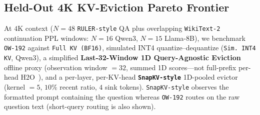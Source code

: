 \documentclass[11pt]{article}
\renewcommand{\_}{\origunderscore\allowbreak}
\begin{document}
\subsection{Held-Out 4K KV-Eviction Pareto Frontier}
\label{sec:kv4k}
At $4\text{K}$ context ($N=48$ \texttt{RULER-style} QA plus overlapping \texttt{WikiText-2} continuation PPL windows: $N=16$ Qwen3, $N=15$ Llama-8B), we benchmark \texttt{OW-192} against \texttt{Full KV (BF16)}, simulated INT4 quantize--dequantize (\texttt{Sim.\ INT4 KV}, Qwen3), a simplified \textbf{Last-32-Window 1D Query-Agnostic Eviction} offline proxy (observation window $=32$, summed 1D scores---not full-prefix per-head H2O~\cite{zhang2023h2o}), and a per-layer, per-KV-head \textbf{\texttt{SnapKV-style}} 1D-pooled evictor (kernel $=5$, $10\%$ recent ratio, $4$ sink tokens). \texttt{SnapKV-style} observes the formatted prompt containing the question whereas \texttt{OW-192} routes on the raw question text (short-query routing is also shown).
\end{document}

